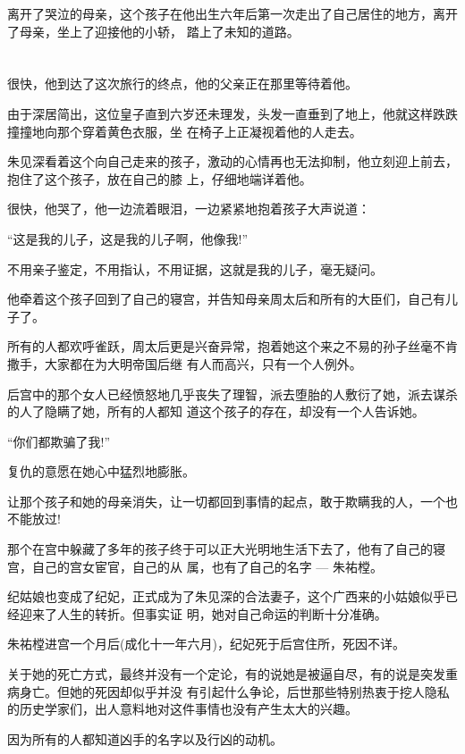 \documentclass[11pt,a4paper,onecolumn]{article}
\begin{document}
离开了哭泣的母亲，这个孩子在他出生六年后第一次走出了自己居住的地方，离开了母亲，坐上了迎接他的小轿，
踏上了未知的道路。

\section[\thesection]{}

很快，他到达了这次旅行的终点，他的父亲正在那里等待着他。

由于深居简出，这位皇子直到六岁还未理发，头发一直垂到了地上，他就这样跌跌撞撞地向那个穿着黄色衣服，坐
在椅子上正凝视着他的人走去。

朱见深看着这个向自己走来的孩子，激动的心情再也无法抑制，他立刻迎上前去，抱住了这个孩子，放在自己的膝
上，仔细地端详着他。

很快，他哭了，他一边流着眼泪，一边紧紧地抱着孩子大声说道：

``这是我的儿子，这是我的儿子啊，他像我!''

不用亲子鉴定，不用指认，不用证据，这就是我的儿子，毫无疑问。

他牵着这个孩子回到了自己的寝宫，并告知母亲周太后和所有的大臣们，自己有儿子了。

所有的人都欢呼雀跃，周太后更是兴奋异常，抱着她这个来之不易的孙子丝毫不肯撒手，大家都在为大明帝国后继
有人而高兴，只有一个人例外。

后宫中的那个女人已经愤怒地几乎丧失了理智，派去堕胎的人敷衍了她，派去谋杀的人了隐瞒了她，所有的人都知
道这个孩子的存在，却没有一个人告诉她。

``你们都欺骗了我!''

复仇的意愿在她心中猛烈地膨胀。

让那个孩子和她的母亲消失，让一切都回到事情的起点，敢于欺瞒我的人，一个也不能放过!

那个在宫中躲藏了多年的孩子终于可以正大光明地生活下去了，他有了自己的寝宫，自己的宫女宦官，自己的从
属，也有了自己的名字 --- 朱祐樘。

纪姑娘也变成了纪妃，正式成为了朱见深的合法妻子，这个广西来的小姑娘似乎已经迎来了人生的转折。但事实证
明，她对自己命运的判断十分准确。

朱祐樘进宫一个月后(成化十一年六月)，纪妃死于后宫住所，死因不详。

关于她的死亡方式，最终并没有一个定论，有的说她是被逼自尽，有的说是突发重病身亡。但她的死因却似乎并没
有引起什么争论，后世那些特别热衷于挖人隐私的历史学家们，出人意料地对这件事情也没有产生太大的兴趣。

因为所有的人都知道凶手的名字以及行凶的动机。
\end{document}
